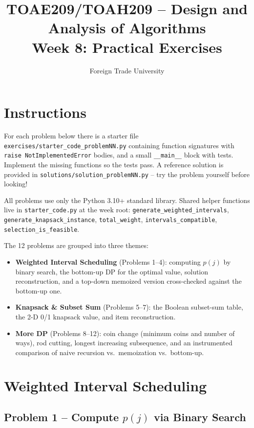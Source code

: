 \documentclass[11pt]{article}
\title{TOAE209/TOAH209 -- Design and Analysis of Algorithms\\[4pt]
\large Week 8: Practical Exercises}
\author{Foreign Trade University}
\date{}
\begin{document}
\maketitle

\section*{Instructions}

For each problem below there is a starter file
\texttt{exercises/starter\_code\_problemNN.py} containing function signatures with
\texttt{raise NotImplementedError} bodies, and a small \texttt{\_\_main\_\_} block with
tests. Implement the missing functions so the tests pass. A reference solution is
provided in \texttt{solutions/solution\_problemNN.py} -- try the problem yourself before
looking!

All problems use only the Python 3.10+ standard library. Shared helper functions live in
\texttt{starter\_code.py} at the week root: \texttt{generate\_weighted\_intervals},
\texttt{generate\_knapsack\_instance}, \texttt{total\_weight},
\texttt{intervals\_compatible}, \texttt{selection\_is\_feasible}.

The 12 problems are grouped into three themes:
\begin{itemize}
    \item \textbf{Weighted Interval Scheduling} (Problems 1--4): computing $p(j)$ by binary
    search, the bottom-up DP for the optimal value, solution reconstruction, and a
    top-down memoized version cross-checked against the bottom-up one.
    \item \textbf{Knapsack \& Subset Sum} (Problems 5--7): the Boolean subset-sum table,
    the 2-D 0/1 knapsack value, and item reconstruction.
    \item \textbf{More DP} (Problems 8--12): coin change (minimum coins and number of
    ways), rod cutting, longest increasing subsequence, and an instrumented comparison of
    naive recursion vs.\ memoization vs.\ bottom-up.
\end{itemize}

\newpage
\section{Weighted Interval Scheduling}

\subsection*{Problem 1 -- Compute $p(j)$ via Binary Search}
\end{document}
